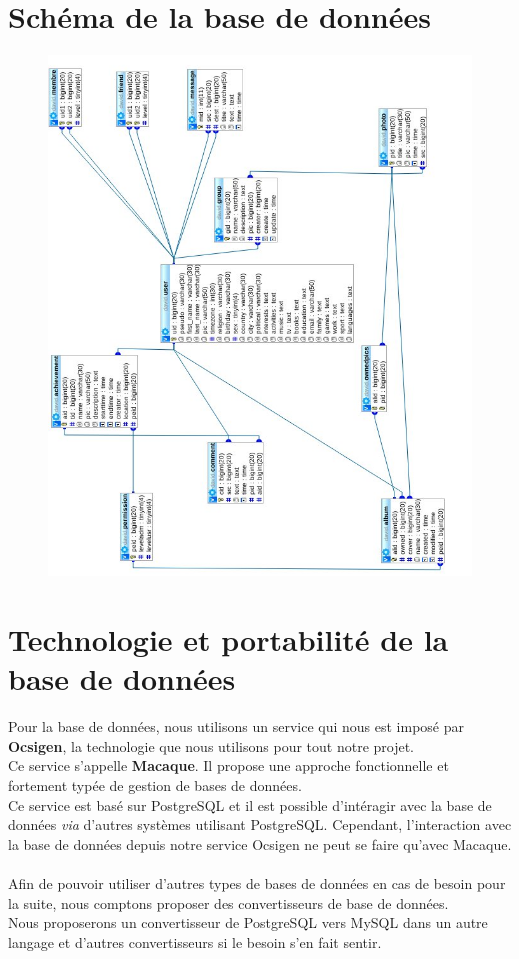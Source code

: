\documentclass{life-fr}
\begin{document}
\section{Schéma de la base de données}

\begin{figure}[H]
  \begin{center}
    \includegraphics[width=18cm]{img/imgdb.jpg}
  \end{center}
\end{figure}

\section{Technologie et portabilité de la base de données}

Pour la base de données, nous utilisons un service qui nous est imposé par
\textbf{Ocsigen}, la technologie que nous utilisons pour tout notre projet.\\
Ce service s'appelle \textbf{Macaque}. Il propose une approche fonctionnelle
et fortement typée de gestion de bases de données.\\
Ce service est basé sur PostgreSQL et il est possible d'intéragir avec la
base de données \textit{via} d'autres systèmes utilisant PostgreSQL.
Cependant, l'interaction avec la base de données depuis notre service Ocsigen
ne peut se faire qu'avec Macaque.\\
\\
Afin de pouvoir utiliser d'autres types de bases de données en cas de besoin
pour la suite, nous comptons proposer des convertisseurs de base de données.\\
Nous proposerons un convertisseur de PostgreSQL vers MySQL dans un autre langage et
d'autres convertisseurs si le besoin s'en fait sentir.
\end{document}
